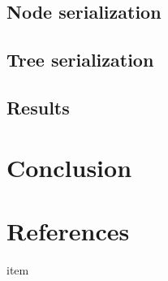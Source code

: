 \documentclass[11pt, oneside]{article}
\begin{document}
\subsection{Node serialization}


\subsection{Tree serialization}


\subsection{Results}


\section{Conclusion}


\section{References}

\noindent

\begin{description}

\item item

\end{description}
\end{document}
